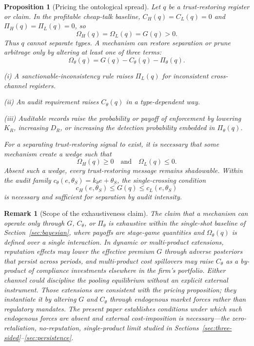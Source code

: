\documentclass[review,authoryear]{elsarticle}
\newtheorem{proposition}{Proposition}
\newtheorem{remark}{Remark}
\theoremstyle{definition}
\theoremstyle{plain}
\begin{document}
\begin{proposition}[Pricing the ontological spread]
\label{prop:pricing}
Let $q$ be a trust-restoring register or claim.  In the profitable cheap-talk
baseline, $C_H(q)=C_L(q)=0$ and $\Pi_H(q)=\Pi_L(q)=0$, so
\[
\Omega_H(q)=\Omega_L(q)=G(q)>0.
\]
Thus $q$ cannot separate types.  A mechanism can restore separation or prune
arbitrage only by altering at least one of three terms:
\[
\Omega_\theta(q)=G(q)-C_\theta(q)-\Pi_\theta(q).
\]

\emph{(i)} A sanctionable-inconsistency rule raises $\Pi_L(q)$ for inconsistent
cross-channel registers.

\emph{(ii)} An audit requirement raises $C_\theta(q)$ in a type-dependent way.

\emph{(iii)} Auditable records raise the probability or payoff of enforcement by
lowering $K_R$, increasing $D_R$, or increasing the detection probability
embedded in $\Pi_\theta(q)$.

\noindent
For a separating trust-restoring signal to exist, it is necessary that some
mechanism create a wedge such that
\[
\Omega_H(q)\ge 0 \quad \text{and} \quad \Omega_L(q)\le 0.
\]
Absent such a wedge, every trust-restoring message remains shadowable.
Within the audit family $c_\theta(e,\theta_S)=k_\theta e+\theta_S$,
the single-crossing condition
\[
c_H(e,\theta_S)\le G(q)\le c_L(e,\theta_S)
\]
is necessary and sufficient for separation by audit intensity.
\end{proposition}

\begin{remark}[Scope of the exhaustiveness claim]
\label{rem:three-terms-scope}
The claim that a mechanism can operate \emph{only} through $G$, $C_\theta$, or
$\Pi_\theta$ is exhaustive within the single-shot baseline of
Section~\ref{sec:bayesian}, where payoffs are stage-game quantities and
$\Omega_\theta(q)$ is defined over a single interaction.  In dynamic or
multi-product extensions, reputation effects may lower the effective premium
$G$ through adverse posteriors that persist across periods, and multi-product
cost spillovers may raise $C_\theta$ as a by-product of compliance
investments elsewhere in the firm's portfolio.  Either channel could
discipline the pooling equilibrium without an explicit external instrument.
Those extensions are consistent with the pricing proposition; they
instantiate it by altering $G$ and $C_\theta$ through endogenous market
forces rather than regulatory mandates.  The present paper establishes
conditions under which such endogenous forces are absent and external
cost-imposition is necessary---the zero-retaliation, no-reputation,
single-product limit studied in Sections~\ref{sec:three-sided}--\ref{sec:persistence}.
\end{remark}
\end{document}
